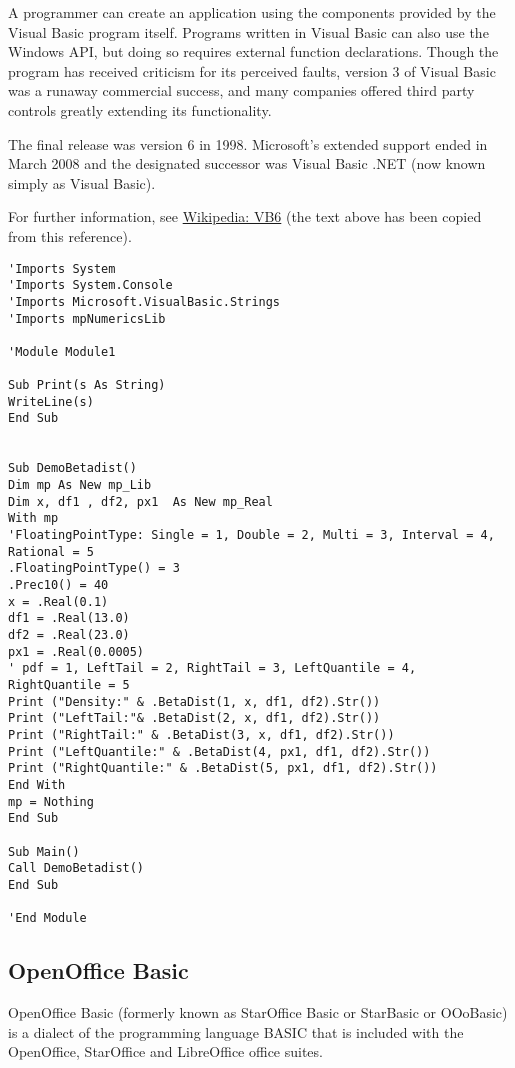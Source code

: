 \vpara
A programmer can create an application using the components provided by the Visual Basic program itself. Programs written in Visual Basic can also use the Windows API, but doing so requires external function declarations. Though the program has received criticism for its perceived faults, version 3 of Visual Basic was a runaway commercial success, and many companies offered third party controls greatly extending its functionality.

\vpara
The final release was version 6 in 1998. Microsoft's extended support ended in March 2008 and the designated successor was Visual Basic .NET (now known simply as Visual Basic).

For further information, see \href{http://en.wikipedia.org/wiki/Visual_Basic}{Wikipedia: VB6} (the text above has been copied from this reference).

\begin{lstlisting}
'Imports System
'Imports System.Console
'Imports Microsoft.VisualBasic.Strings
'Imports mpNumericsLib

'Module Module1

Sub Print(s As String)
WriteLine(s)
End Sub


Sub DemoBetadist()
Dim mp As New mp_Lib
Dim x, df1 , df2, px1  As New mp_Real
With mp
'FloatingPointType: Single = 1, Double = 2, Multi = 3, Interval = 4, Rational = 5
.FloatingPointType() = 3
.Prec10() = 40
x = .Real(0.1)
df1 = .Real(13.0)
df2 = .Real(23.0)
px1 = .Real(0.0005)	
' pdf = 1, LeftTail = 2, RightTail = 3, LeftQuantile = 4, RightQuantile = 5
Print ("Density:" & .BetaDist(1, x, df1, df2).Str())
Print ("LeftTail:"& .BetaDist(2, x, df1, df2).Str())
Print ("RightTail:" & .BetaDist(3, x, df1, df2).Str())
Print ("LeftQuantile:" & .BetaDist(4, px1, df1, df2).Str())
Print ("RightQuantile:" & .BetaDist(5, px1, df1, df2).Str())
End With
mp = Nothing
End Sub

Sub Main()
Call DemoBetadist()
End Sub

'End Module
\end{lstlisting}




\newpage
\subsection{OpenOffice Basic}

OpenOffice Basic (formerly known as StarOffice Basic or StarBasic or OOoBasic) is a dialect of the programming language BASIC that is included with the OpenOffice, StarOffice and LibreOffice office suites.

